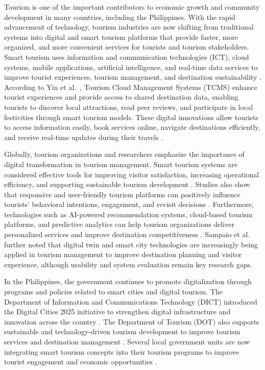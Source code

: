\documentclass{research}
\begin{document}
Tourism is one of the important contributors to economic growth and community development in many countries, including the Philippines. With the rapid advancement of technology, tourism industries are now shifting from traditional systems into digital and smart tourism platforms that provide faster, more organized, and more convenient services for tourists and tourism stakeholders. Smart tourism uses information and communication technologies (ICT), cloud systems, mobile applications, artificial intelligence, and real-time data services to improve tourist experiences, tourism management, and destination sustainability \cite{galvao2024}. According to Yin et al.\ \cite{yin2022}, Tourism Cloud Management Systems (TCMS) enhance tourist experiences and provide access to shared destination data, enabling tourists to discover local attractions, read peer reviews, and participate in local festivities through smart tourism models. These digital innovations allow tourists to access information easily, book services online, navigate destinations efficiently, and receive real-time updates during their travels \cite{qi2021}.

Globally, tourism organizations and researchers emphasize the importance of digital transformation in tourism management. Smart tourism systems are considered effective tools for improving visitor satisfaction, increasing operational efficiency, and supporting sustainable tourism development \cite{tavitiyaman2021}. Studies also show that responsive and user-friendly tourism platforms can positively influence tourists' behavioral intentions, engagement, and revisit decisions \cite{park2021}. Furthermore, technologies such as AI-powered recommendation systems, cloud-based tourism platforms, and predictive analytics can help tourism organizations deliver personalized services and improve destination competitiveness \cite{vavpotic2021}. Sampaio et al.\ \cite{sampaio2025} further noted that digital twin and smart city technologies are increasingly being applied in tourism management to improve destination planning and visitor experience, although usability and system evaluation remain key research gaps.

In the Philippines, the government continues to promote digitalization through programs and policies related to smart cities and digital tourism. The Department of Information and Communications Technology (DICT) introduced the Digital Cities 2025 initiative to strengthen digital infrastructure and innovation across the country \cite{dict2020}. The Department of Tourism (DOT) also supports sustainable and technology-driven tourism development to improve tourism services and destination management \cite{dot2022}. Several local government units are now integrating smart tourism concepts into their tourism programs to improve tourist engagement and economic opportunities \cite{dost2024}.
\end{document}

